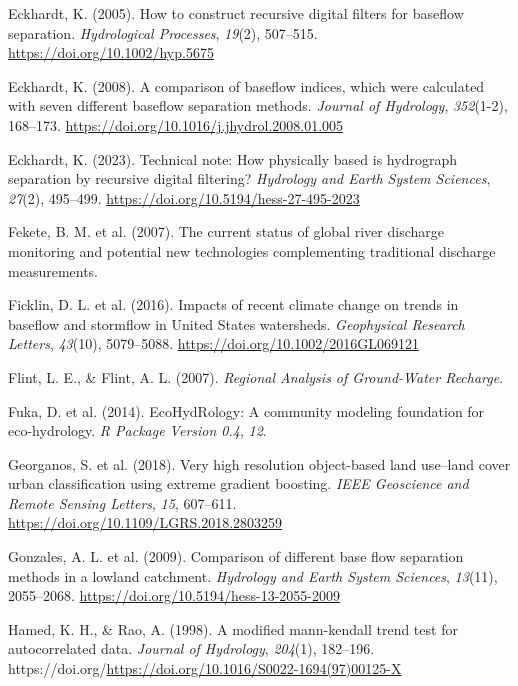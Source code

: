 \documentclass[
]{agujournal2019}
\newlength{\cslhangindent}
\newenvironment{CSLReferences}[2] %
 {\begin{list}{}{%
  \setlength{\itemindent}{0pt}
  \setlength{\leftmargin}{0pt}
  \setlength{\parsep}{0pt}
  \ifodd #1
   \setlength{\leftmargin}{\cslhangindent}
   \setlength{\itemindent}{-1\cslhangindent}
  \fi
  \setlength{\itemsep}{#2\baselineskip}}}
 {\end{list}}
\begin{document}
\begin{CSLReferences}{1}{0}
Eckhardt, K. (2005). How to construct recursive digital filters for
baseflow separation. \emph{Hydrological Processes}, \emph{19}(2),
507--515. \url{https://doi.org/10.1002/hyp.5675}

Eckhardt, K. (2008). A comparison of baseflow indices, which were
calculated with seven different baseflow separation methods.
\emph{Journal of Hydrology}, \emph{352}(1-2), 168--173.
\url{https://doi.org/10.1016/j.jhydrol.2008.01.005}

Eckhardt, K. (2023). Technical note: How physically based is hydrograph
separation by recursive digital filtering? \emph{Hydrology and Earth
System Sciences}, \emph{27}(2), 495--499.
\url{https://doi.org/10.5194/hess-27-495-2023}

Fekete, B. M. et al. (2007). The current status of global river
discharge monitoring and potential new technologies complementing
traditional discharge measurements.

Ficklin, D. L. et al. (2016). Impacts of recent climate change on trends
in baseflow and stormflow in United States watersheds. \emph{Geophysical
Research Letters}, \emph{43}(10), 5079--5088.
\url{https://doi.org/10.1002/2016GL069121}

Flint, L. E., \& Flint, A. L. (2007). \emph{Regional Analysis of
Ground-Water Recharge}.

Fuka, D. et al. (2014). EcoHydRology: A community modeling foundation
for eco-hydrology. \emph{R Package Version 0.4}, \emph{12}.

Georganos, S. et al. (2018). Very high resolution object-based land
use--land cover urban classification using extreme gradient boosting.
\emph{IEEE Geoscience and Remote Sensing Letters}, \emph{15}, 607--611.
\url{https://doi.org/10.1109/LGRS.2018.2803259}

Gonzales, A. L. et al. (2009). Comparison of different base flow
separation methods in a lowland catchment. \emph{Hydrology and Earth
System Sciences}, \emph{13}(11), 2055--2068.
\url{https://doi.org/10.5194/hess-13-2055-2009}

Hamed, K. H., \& Rao, A. (1998). A modified mann-kendall trend test for
autocorrelated data. \emph{Journal of Hydrology}, \emph{204}(1),
182--196.
https://doi.org/\url{https://doi.org/10.1016/S0022-1694(97)00125-X}


\end{CSLReferences}
\end{document}
